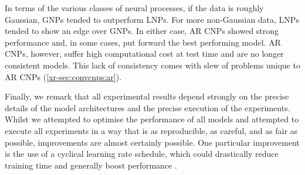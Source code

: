 \documentclass[12pt, twoside]{report}
\newcommand{\xrprefix}[1]{xr-#1}
\begin{document}
In terms of the various classes of neural processes,
if the data is roughly Gaussian, GNPs tended to outperform LNPs.
For more non-Gaussian data, LNPs tended to show an edge over GNPs.
In either case, AR CNPs showed strong performance and, in some cases, put forward the best performing model.
AR CNPs, however, suffer high computational cost at test time and are no longer consistent models.
This lack of consistency comes with slew of problems unique to AR CNPs (\cref{\xrprefix{sec:convcnps:ar}}).

Finally, we remark that all experimental results depend strongly on the precise details of the model architectures and the precise execution of the experiments.
Whilst we attempted to optimise the performance of all models and attempted to execute all experiments in a way that is as reproducible, as careful, and as fair as possible,
improvements are almost certainly possible.
One particular improvement is the use of a cyclical learning rate schedule,
which could drastically reduce training time and generally boost performance \parencite{Smith:2017:Cyclical_Learning_Rates_for_Training}.
\end{document}
